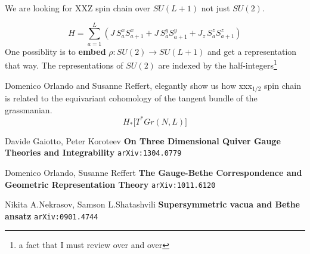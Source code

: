 \documentclass[12pt]{article}
\begin{document}
\newpage

\noindent We are looking for XXZ spin chain over $SU(L+1)$ not just $SU(2)$.

$$ H =  \sum_{a=1}^L ( J  \, S_a^x S_{a+1}^x + 
J \, S_a^y S_{a+1}^y + J_z \,
S_a^z S_{a+1}^z )$$
One possiblity is to \textbf{embed} $\rho: SU(2) \to SU(L+1)$ and get a representation that way.  The representations of $SU(2)$ are indexed by the half-integers\footnote{a fact that I must review over and over} \newline

\noindent Domenico Orlando and Susanne Reffert, elegantly show us how xxx$_{1/2}$ spin chain is related to the equivariant cohomology of the tangent bundle of the grassmanian.
$$ H_\ast \big[T^\ast Gr(N, L)\big] $$

\newpage
{}\selectfont \fontsize{12}{10}\selectfont

\begin{thebibliography}{}

\item Davide Gaiotto, Peter Koroteev \textbf{On Three Dimensional Quiver Gauge Theories and Integrability} \texttt{arXiv:1304.0779}

\item Domenico Orlando, Susanne Reffert \textbf{The Gauge-Bethe Correspondence and Geometric Representation Theory} \texttt{arXiv:1011.6120}


\item Nikita A.Nekrasov, Samson L.Shatashvili \textbf{Supersymmetric vacua and Bethe ansatz} \texttt{arXiv:0901.4744}

\end{thebibliography}
\end{document}
